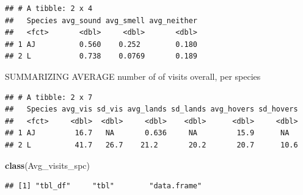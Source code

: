 \documentclass[]{article}
\newenvironment{Shaded}{\begin{snugshade}}{\end{snugshade}}
\newcommand{\KeywordTok}[1]{\textcolor[rgb]{0.13,0.29,0.53}{\textbf{{#1}}}}
\newcommand{\DataTypeTok}[1]{\textcolor[rgb]{0.13,0.29,0.53}{{#1}}}
\newcommand{\StringTok}[1]{\textcolor[rgb]{0.31,0.60,0.02}{{#1}}}
\newcommand{\OtherTok}[1]{\textcolor[rgb]{0.56,0.35,0.01}{{#1}}}
\newcommand{\NormalTok}[1]{{#1}}
\begin{document}
\begin{verbatim}
## # A tibble: 2 x 4
##   Species avg_sound avg_smell avg_neither
##   <fct>       <dbl>     <dbl>       <dbl>
## 1 AJ          0.560    0.252        0.180
## 2 L           0.738    0.0769       0.189
\end{verbatim}

SUMMARIZING AVERAGE number of of visits overall, per species

\begin{Shaded}
\end{Shaded}

\begin{verbatim}
## # A tibble: 2 x 7
##   Species avg_vis sd_vis avg_lands sd_lands avg_hovers sd_hovers
##   <fct>     <dbl>  <dbl>     <dbl>    <dbl>      <dbl>     <dbl>
## 1 AJ         16.7   NA       0.636     NA         15.9      NA  
## 2 L          41.7   26.7    21.2       20.2       20.7      10.6
\end{verbatim}

\begin{Shaded}
\begin{Highlighting}[]
\KeywordTok{class}\NormalTok{(Avg_visits_spc)}
\end{Highlighting}
\end{Shaded}

\begin{verbatim}
## [1] "tbl_df"     "tbl"        "data.frame"
\end{verbatim}
\end{document}
